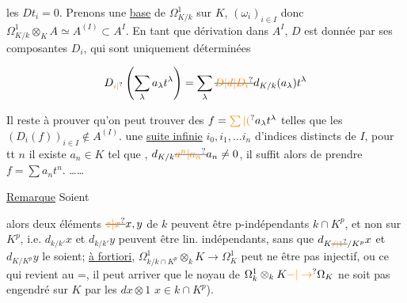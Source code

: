 les $Dt_i=0$.  Prenons une \uline{base} de $\Omega^1_{K/k}$ sur $K$,  $(\omega_i)_{i\in I}$ donc $\Omega^1_{K/k}\otimes_K A\simeq A^{(I)}\subset A^I$. En tant que dérivation dans $A^I$, $D$ est donnée par ses composantes $D_i$, qui sont uniquement déterminées

\[ D_{\unsure{i|\vphantom{i}}}\left(\sum_\lambda a_\lambda t^\lambda\right)=\sum_\lambda\deleted{\unsure{D|d|D_i}}d_{K/k}(a_\lambda)t^\lambda \]

Il reste à prouver qu'on peut trouver des $f=\unsure{\sum|(}a_\lambda t^\lambda$ telles que les $(D_i(f))_{i\in I}\notin A^{(I)}$.       une \uline{suite infinie} $i_0,i_1,\ldots i_n$ d'indices distincts de $I$,  pour tt $n$ il existe $a_n\in K$ tel que  ,  $d_{K/k}\deleted{\unsure{a^n|a_n}}a_n\ne0$, il suffit alors de prendre $f=\sum a_n t^n$. \ldots\ldots


\uline{Remarque} Soient


alors deux éléments $\deleted{\unsure{z|x}}x,y$ de $k$ peuvent être p-indépendants   $k\cap K^p$, et non  sur $K^p$, i.e. $d_{k/k'}x$ et $d_{k/k'}y$ peuvent être lin. indépendants, sans que $d_{K\deleted{\unsure{/|1}}/K^p}x$ et $d_{K/K^p}y$ le soient; \uline{à fortiori}, $\Omega^1_{k/k\cap K^p}\otimes_k K\to\Omega^1_K$ peut ne être pas injectif, ou  ce qui revient au =, il peut arriver que le noyau  de $\Omega^1_k\otimes_k K\unsure{-|\to}\Omega_K$ ne soit pas engendré sur $K$ par les $dx\otimes1$  $x\in k\cap K^p$).


